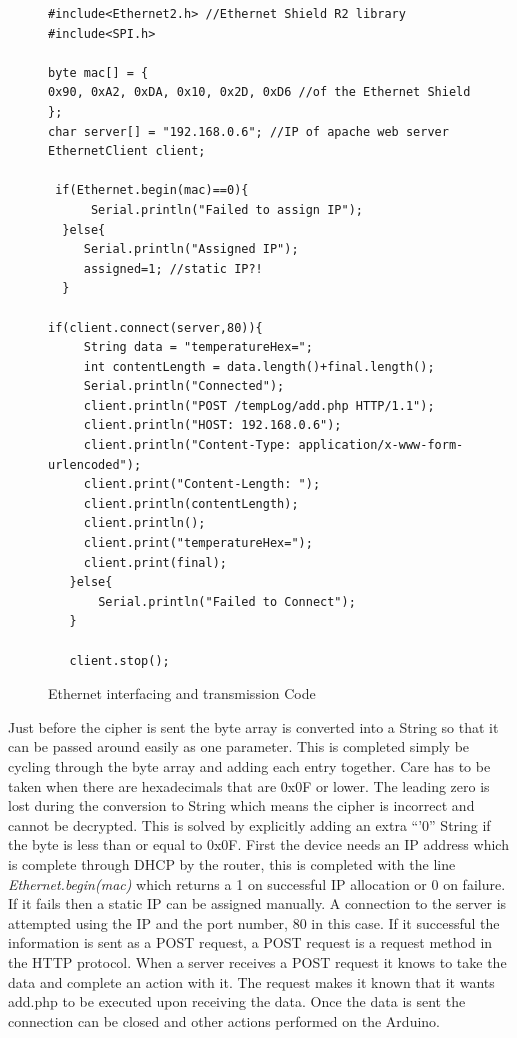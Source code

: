 \begin{figure}[H]
\begin{lstlisting}[style=Arduino]
#include<Ethernet2.h> //Ethernet Shield R2 library
#include<SPI.h>

byte mac[] = {
0x90, 0xA2, 0xDA, 0x10, 0x2D, 0xD6 //of the Ethernet Shield
};
char server[] = "192.168.0.6"; //IP of apache web server
EthernetClient client;

 if(Ethernet.begin(mac)==0){
      Serial.println("Failed to assign IP");
  }else{
     Serial.println("Assigned IP");
     assigned=1; //static IP?!
  }

if(client.connect(server,80)){
     String data = "temperatureHex=";
     int contentLength = data.length()+final.length();
     Serial.println("Connected");   
     client.println("POST /tempLog/add.php HTTP/1.1"); 
     client.println("HOST: 192.168.0.6"); 
     client.println("Content-Type: application/x-www-form-urlencoded");
     client.print("Content-Length: ");
     client.println(contentLength);
     client.println();
     client.print("temperatureHex=");
     client.print(final);
   }else{
       Serial.println("Failed to Connect");
   }
   
   client.stop();
\end{lstlisting}
\caption{Ethernet interfacing and transmission Code }
\label{snip:ethernet}
\end{figure}
 Just before the cipher is sent the byte array is converted into a String so that it can be passed around easily as one parameter. This is completed simply be cycling through the byte array and adding each entry together. Care has to be taken when there are hexadecimals that are 0x0F or lower. The leading zero is lost during the conversion to String which means the cipher is incorrect and cannot be decrypted. This is solved by explicitly adding an extra ``'0'' String if the byte is less than or equal to 0x0F. First the device needs an IP address which is complete through DHCP by the router, this is completed with the line \emph{Ethernet.begin(mac)} which returns a 1 on successful IP allocation or 0 on failure. If it fails then a static IP can be assigned manually. A connection to the server is attempted using the IP and the port number, 80 in this case. If it successful the information is sent as a POST request, a POST request is a request method in the HTTP protocol. When a server receives a POST request it knows to take the data and complete an action with it. The request makes it known that it wants add.php to be executed upon receiving the data. %
Once the data is sent the connection can be closed and other actions performed on the Arduino.
 
